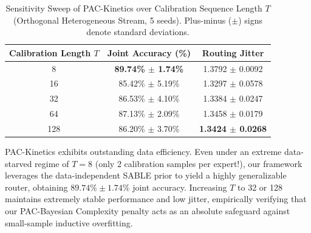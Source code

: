 \begin{table}[tb]
\centering
\caption{Sensitivity Sweep of PAC-Kinetics over Calibration Sequence Length $T$ (Orthogonal Heterogeneous Stream, 5 seeds). Plus-minus ($\pm$) signs denote standard deviations.}
\label{tab:length_sweep}
\vskip 0.1in
\begin{tabular}{ccc}
\toprule
Calibration Length $T$ & Joint Accuracy (\%) & Routing Jitter \\
\midrule
8 & \textbf{89.74\% $\pm$ 1.74\%} & 1.3792 $\pm$ 0.0092 \\
16 & 85.42\% $\pm$ 5.19\% & 1.3297 $\pm$ 0.0578 \\
32 & 86.53\% $\pm$ 4.10\% & 1.3384 $\pm$ 0.0247 \\
64 & 87.13\% $\pm$ 2.09\% & 1.3458 $\pm$ 0.0179 \\
128 & 86.20\% $\pm$ 3.70\% & \textbf{1.3424 $\pm$ 0.0268} \\
\bottomrule
\end{tabular}
\end{table}

PAC-Kinetics exhibits outstanding data efficiency. Even under an extreme data-starved regime of $T=8$ (only 2 calibration samples per expert!), our framework leverages the data-independent SABLE prior to yield a highly generalizable router, obtaining $89.74\% \pm 1.74\%$ joint accuracy. Increasing $T$ to 32 or 128 maintains extremely stable performance and low jitter, empirically verifying that our PAC-Bayesian Complexity penalty acts as an absolute safeguard against small-sample inductive overfitting.

